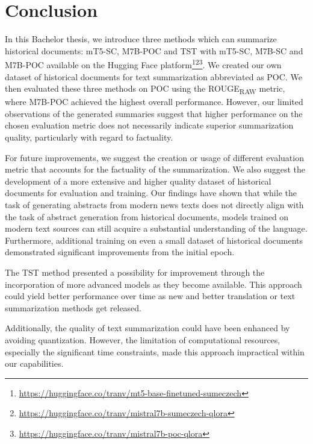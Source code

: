 \documentclass[english, ba, kiv, he, iso690numb, pdf, viewonly]{fasthesis}
\begin{document}
\chapter{Conclusion}
In this Bachelor thesis, we introduce three methods which can summarize historical documents: mT5-SC, M7B-POC and TST with mT5-SC, M7B-SC and M7B-POC available on the Hugging Face platform\footnote{\url{https://huggingface.co/tranv/mt5-base-finetuned-sumeczech}}\footnote{\url{https://huggingface.co/tranv/mistral7b-sumeczech-qlora}}\footnote{\url{https://huggingface.co/tranv/mistral7b-poc-qlora}}. We created our own dataset of historical documents for text summarization abbreviated as POC. We then evaluated these three methods on POC using the ROUGE\textsubscript{RAW} metric, where M7B-POC achieved the highest overall performance. However, our limited observations of the generated summaries suggest that higher performance on the chosen evaluation metric does not necessarily indicate superior summarization quality, particularly with regard to factuality.

For future improvements, we suggest the creation or usage of different evaluation metric that accounts for the factuality of the summarization. We also suggest the development of a more extensive and higher quality dataset of historical documents for evaluation and training. Our findings have shown that while the task of generating abstracts from modern news texts does not directly align with the task of abstract generation from historical documents, models trained on modern text sources can still acquire a substantial understanding of the language. Furthermore, additional training on even a small dataset of historical documents demonstrated significant improvements from the initial epoch.

The TST method presented a possibility for improvement through the incorporation of more advanced models as they become available. This approach could yield better performance over time as new and better translation or text summarization methods get released.

Additionally, the quality of text summarization could have been enhanced by avoiding quantization. However, the limitation of computational resources, especially the significant time constraints, made this approach impractical within our capabilities.

%
%
%
%
\end{document}
